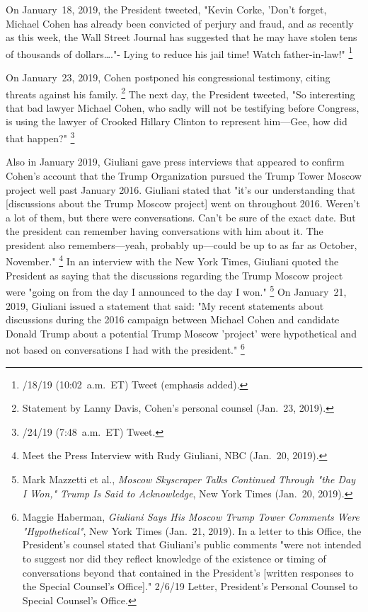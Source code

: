 On January~18, 2019, the President tweeted, "Kevin Corke, \@FoxNews 'Don't forget, Michael Cohen has already been convicted of perjury and fraud, and as recently as this week, the Wall Street Journal has suggested that he may have stolen tens of thousands of dollars\dots."- Lying to reduce his jail time! Watch father-in-law!"%
\footnote{/18/19 (10:02~a.m.~ET) Tweet (emphasis added).}

On January~23, 2019, Cohen postponed his congressional testimony, citing threats against his family.%
\footnote{Statement by Lanny Davis, Cohen's personal counsel (Jan.~23, 2019).}
The next day, the President tweeted, "So interesting that bad lawyer Michael Cohen, who sadly will not be testifying before Congress, is using the lawyer of Crooked Hillary Clinton to represent him---Gee, how did that happen?"%
\footnote{/24/19 (7:48~a.m.~ET) Tweet.}

Also in January 2019, Giuliani gave press interviews that appeared to confirm Cohen's account that the Trump Organization pursued the Trump Tower Moscow project well past January 2016.
Giuliani stated that "it's our understanding that [discussions about the Trump Moscow project] went on throughout 2016.
Weren't a lot of them, but there were conversations.
Can't be sure of the exact date.
But the president can remember having conversations with him about it.
The president also remembers---yeah, probably up---could be up to as far as October, November."%
\footnote{Meet the Press Interview with Rudy Giuliani, NBC (Jan.~20, 2019).}
In an interview with the New York Times, Giuliani quoted the President as saying that the discussions regarding the Trump Moscow project were "going on from the day I announced to the day I won."%
\footnote{Mark Mazzetti et al., \textit{Moscow Skyscraper Talks Continued Through "the Day I Won," Trump Is Said to Acknowledge}, New York Times (Jan.~20, 2019).}
On January~21, 2019, Giuliani issued a statement that said: "My recent statements about discussions during the 2016 campaign between Michael Cohen and candidate Donald Trump about a potential Trump Moscow 'project' were hypothetical and not based on conversations I had with the president."%
\footnote{Maggie Haberman, \textit{Giuliani Says His Moscow Trump Tower Comments Were "Hypothetical"}, New York Times (Jan.~21, 2019).
In a letter to this Office, the President's counsel stated that Giuliani's public comments "were not intended to suggest nor did they reflect knowledge of the existence or timing of conversations beyond that contained in the President's [written responses to the Special Counsel's Office]."
2/6/19 Letter, President's Personal Counsel to Special Counsel's Office.}

